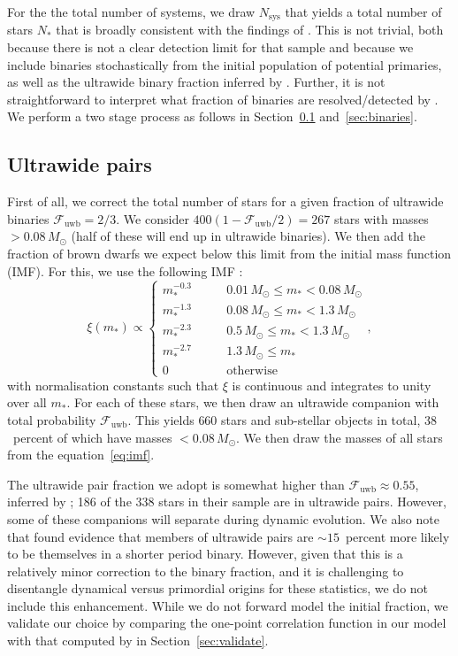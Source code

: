 \documentclass{aa}
\begin{document}
For the the total number of systems, we draw $N_\mathrm{sys}$ that yields a total number of stars $N_*$ that is broadly consistent with the findings of \citet{Luhman23}. This is not trivial, both because there is not a clear detection limit for that sample and because we include binaries stochastically from the initial population of potential primaries, as well as the ultrawide binary fraction inferred by \citet{Joncour17}. Further, it is not straightforward to interpret what fraction of binaries are resolved/detected by \citet{Luhman23}. {We perform a two stage process as follows in Section~\ref{sec:uwps} and~\ref{sec:binaries}.} 

\subsection{Ultrawide pairs}
\label{sec:uwps}
{First of all, we correct the total number of stars for a given fraction of ultrawide binaries $\mathcal{F}_{\mathrm{uwb}} =2/3$. We consider $400(1-\mathcal{F}_\mathrm{uwb}/2) = 267$ stars with masses $>0.08 \, M_\odot$ (half of these will end up in ultrawide binaries). We then add the fraction of brown dwarfs we expect below this limit from the initial mass function (IMF). }For this, we use the following IMF \citep[e.g.][]{Kro01}:
\begin{equation}
\label{eq:imf}
    \xi(m_*) \propto  \begin{cases}
        m_* ^ {-0.3} & \qquad 0.01 \, M_\odot \leq m_*<  0.08 \,M_\odot \\
        m_* ^ {-1.3} & \qquad 0.08 \, M_\odot \leq m_*<  1.3 \,M_\odot \\
        m_* ^ {-2.3}& \qquad 0.5 \, M_\odot \leq m_* < 1.3 \,M_\odot\\
        m_* ^ {-2.7} & \qquad  1.3 \, M_\odot\leq m_* \\
        0 &\qquad \mathrm{otherwise}
    \end{cases},
\end{equation}with normalisation constants such that $\xi$ is continuous and integrates to unity over all $m_*$. For each of these stars, we then draw an ultrawide companion with total probability $\mathcal{F}_{\mathrm{uwb}}$. This yields $660$ stars and sub-stellar objects in total, $38$~percent of which have masses $<0.08\, M_\odot$. We then draw the masses of all stars from the equation~\ref{eq:imf}. 

{The ultrawide pair fraction we adopt is somewhat higher than $\mathcal{F}_{\mathrm{uwb}} \approx 0.55$, inferred by \citet{Joncour17}; 186 of the 338 stars in their sample are in ultrawide pairs. However, some of these companions will separate during dynamic evolution. We also note that \citet{Joncour17} found evidence that members of ultrawide pairs are $\sim 15$~percent more likely to be themselves in a shorter period binary. However, given that this is a relatively minor correction to the binary fraction, and it is challenging to disentangle dynamical versus primordial origins for these statistics, we do not include this enhancement. While we do not forward model the initial fraction, we validate our choice by comparing the one-point correlation function in our model with that computed by \citet{Joncour17} in Section~\ref{sec:validate}.}
\end{document}
